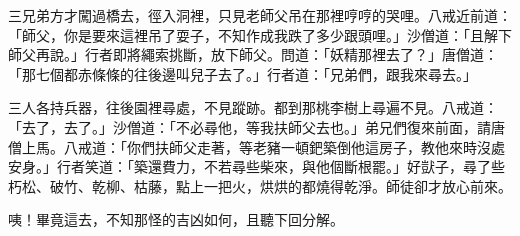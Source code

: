 三兄弟方才闖過橋去，徑入洞裡，只見老師父吊在那裡哼哼的哭哩。八戒近前道：「師父，你是要來這裡吊了耍子，不知作成我跌了多少跟頭哩。」沙僧道：「且解下師父再說。」行者即將繩索挑斷，放下師父。問道：「妖精那裡去了？」唐僧道：「那七個都赤條條的往後邊叫兒子去了。」行者道：「兄弟們，跟我來尋去。」

三人各持兵器，往後園裡尋處，不見蹤跡。都到那桃李樹上尋遍不見。八戒道：「去了，去了。」沙僧道：「不必尋他，等我扶師父去也。」弟兄們復來前面，請唐僧上馬。八戒道：「你們扶師父走著，等老豬一頓鈀築倒他這房子，教他來時沒處安身。」行者笑道：「築還費力，不若尋些柴來，與他個斷根罷。」好獃子，尋了些朽松、破竹、乾柳、枯藤，點上一把火，烘烘的都燒得乾淨。師徒卻才放心前來。

咦！畢竟這去，不知那怪的吉凶如何，且聽下回分解。
